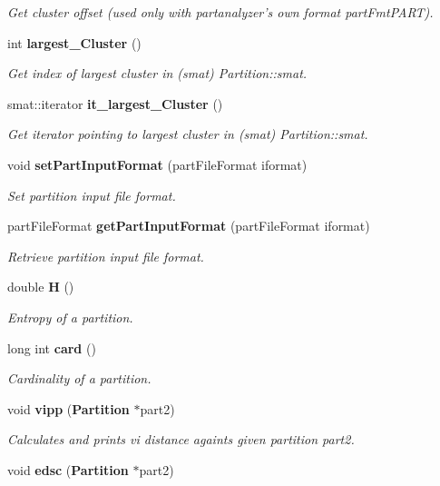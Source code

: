 \begin{CompactItemize}
\begin{CompactList}\small\item\em Get cluster offset (used only with partanalyzer's own format part\-Fmt\-PART). \item\end{CompactList}\item 
int {\bf largest\_\-Cluster} ()\label{classPartition_a13}

\begin{CompactList}\small\item\em Get index of largest cluster in (smat) Partition::smat. \item\end{CompactList}\item 
smat::iterator {\bf it\_\-largest\_\-Cluster} ()\label{classPartition_a14}

\begin{CompactList}\small\item\em Get iterator pointing to largest cluster in (smat) Partition::smat. \item\end{CompactList}\item 
void {\bf set\-Part\-Input\-Format} (part\-File\-Format iformat)\label{classPartition_a15}

\begin{CompactList}\small\item\em Set partition input file format. \item\end{CompactList}\item 
part\-File\-Format {\bf get\-Part\-Input\-Format} (part\-File\-Format iformat)\label{classPartition_a16}

\begin{CompactList}\small\item\em Retrieve partition input file format. \item\end{CompactList}\item 
double {\bf H} ()\label{classPartition_a17}

\begin{CompactList}\small\item\em Entropy of a partition. \item\end{CompactList}\item 
long int {\bf card} ()\label{classPartition_a18}

\begin{CompactList}\small\item\em Cardinality of a partition. \item\end{CompactList}\item 
void {\bf vipp} ({\bf Partition} $\ast$part2)
\begin{CompactList}\small\item\em Calculates and prints vi distance againts given partition part2. \item\end{CompactList}\item 
void {\bf edsc} ({\bf Partition} $\ast$part2)\label{classPartition_a20}


\end{CompactItemize}
